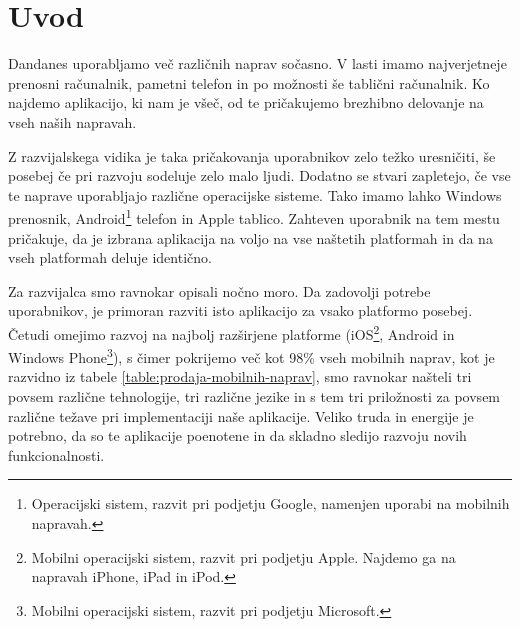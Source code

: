 \graphicspath{{img/}}





\chapter{Uvod}
\label{chap:introduction}


Dandanes uporabljamo več različnih naprav sočasno. V lasti imamo najverjetneje prenosni računalnik, pametni telefon in po možnosti še tablični računalnik. Ko najdemo aplikacijo, ki nam je všeč, od te pričakujemo brezhibno delovanje na vseh naših napravah.

Z razvijalskega vidika je taka pričakovanja uporabnikov zelo težko uresničiti, še posebej če pri razvoju sodeluje zelo malo ljudi. Dodatno se stvari zapletejo, če vse te naprave uporabljajo različne operacijske sisteme. Tako imamo lahko Windows prenosnik, Android\footnote{Operacijski sistem, razvit pri podjetju Google, namenjen uporabi na mobilnih napravah.} telefon in Apple tablico. Zahteven uporabnik na tem mestu pričakuje, da je izbrana aplikacija na voljo na vse naštetih platformah in da na vseh platformah deluje identično.

Za razvijalca smo ravnokar opisali nočno moro. Da zadovolji potrebe uporabnikov, je primoran razviti isto aplikacijo za vsako platformo posebej. Četudi omejimo razvoj na najbolj razširjene platforme (iOS\footnote{Mobilni operacijski sistem, razvit pri podjetju Apple. Najdemo ga na napravah iPhone, iPad in iPod.}, Android in Windows Phone\footnote{Mobilni operacijski sistem, razvit pri podjetju Microsoft.}), s čimer pokrijemo več kot 98\% vseh mobilnih naprav, kot je razvidno iz tabele \ref{table:prodaja-mobilnih-naprav}, smo ravnokar našteli tri povsem različne tehnologije, tri različne jezike in s tem tri priložnosti za povsem različne težave pri implementaciji naše aplikacije. Veliko truda in energije je potrebno, da so te aplikacije poenotene in da skladno sledijo razvoju novih funkcionalnosti.

